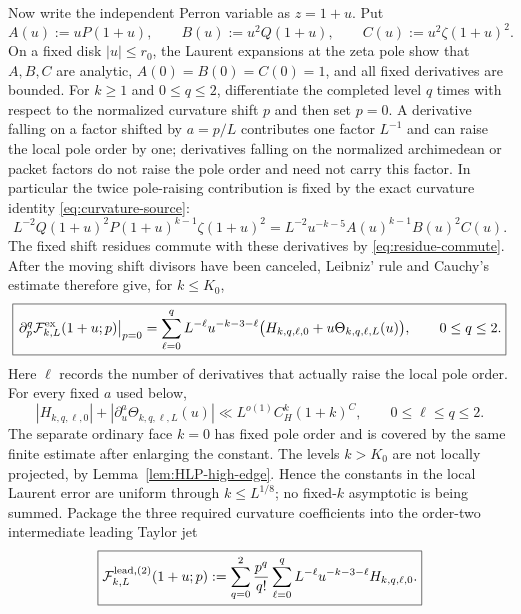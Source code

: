Now write the independent Perron variable as $z=1+u$. Put
\[
A(u):=uP(1+u),\qquad
B(u):=u^2Q(1+u),\qquad
C(u):=u^2\zeta(1+u)^2.
\]
On a fixed disk $|u|\le r_0$, the Laurent expansions at the zeta pole show that
$A,B,C$ are analytic, $A(0)=B(0)=C(0)=1$, and all fixed derivatives are
bounded. For $k\ge1$ and $0\le q\le2$, differentiate the completed level $q$
times with respect to the normalized curvature shift $p$ and then set $p=0$.
A derivative falling on a factor shifted by $a=p/L$ contributes one factor
$L^{-1}$ and can raise the local pole order by one; derivatives falling on the
normalized archimedean or packet factors do not raise the pole order and need
not carry this factor. In particular the twice pole-raising contribution is
fixed by the exact curvature identity \eqref{eq:curvature-source}:
\begin{equation}
\boxed{
L^{-2}Q(1+u)^2P(1+u)^{k-1}\zeta(1+u)^2
=L^{-2}u^{-k-5}A(u)^{k-1}B(u)^2C(u).
}
\label{eq:uniform-level-factorization}
\end{equation}
The fixed shift residues commute with these derivatives by
\eqref{eq:residue-commute}. After the moving shift divisors have been canceled,
Leibniz' rule and Cauchy's estimate therefore give, for $k\le K_0$,
\begin{equation}
\boxed{
\left.\partial_p^q\mathcal F_{k,L}^{\rm ex}(1+u;p)\right|_{p=0}
=\sum_{\ell=0}^qL^{-\ell}u^{-k-3-\ell}
\bigl(H_{k,q,\ell,0}+u\Theta_{k,q,\ell,L}(u)\bigr),
\qquad 0\le q\le2.
}
\label{eq:level-Laurent}
\end{equation}
Here $\ell$ records the number of derivatives that actually raise the local
pole order. For every fixed $a$ used below,
\begin{equation}
\boxed{
|H_{k,q,\ell,0}|+|\partial_u^a\Theta_{k,q,\ell,L}(u)|
\ll L^{o(1)}C_H^k(1+k)^C,
\qquad 0\le\ell\le q\le2.
}
\label{eq:uniform-Hk}
\end{equation}
The separate ordinary face $k=0$ has fixed pole order and is covered by the
same finite estimate after enlarging the constant. The levels $k>K_0$ are not
locally projected, by Lemma~\ref{lem:HLP-high-edge}. Hence the constants in the
local Laurent error are uniform through $k\le L^{1/8}$; no fixed-$k$ asymptotic
is being summed. Package the three required curvature coefficients into the
order-two intermediate leading Taylor jet
\begin{equation}
\boxed{
\mathcal F_{k,L}^{\rm lead,(2)}(1+u;p)
:=\sum_{q=0}^2\frac{p^q}{q!}
\sum_{\ell=0}^qL^{-\ell}u^{-k-3-\ell}H_{k,q,\ell,0}.
}
\label{eq:intermediate-leading-jet}
\end{equation}
